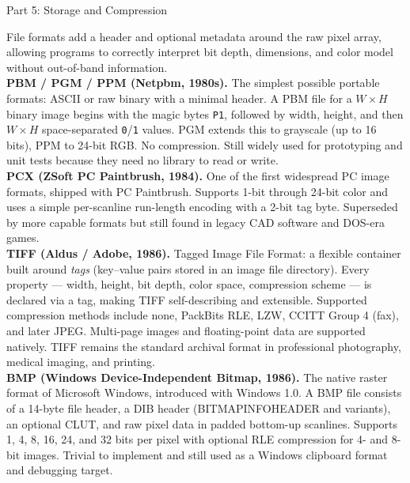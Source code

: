 \documentclass[letterpaper]{article}
\begin{document}
\begin{notes}{Part 5: Storage and Compression}

File formats add a header and optional metadata around the raw pixel array, allowing programs to correctly interpret bit depth, dimensions, and color model without out-of-band information.\\

\textbf{PBM / PGM / PPM (Netpbm, 1980s).} The simplest possible portable formats: ASCII or raw binary with a minimal header. A PBM file for a $W\times H$ binary image begins with the magic bytes \texttt{P1}, followed by width, height, and then $W\times H$ space-separated \texttt{0}/\texttt{1} values. PGM extends this to grayscale (up to 16 bits), PPM to 24-bit RGB. No compression. Still widely used for prototyping and unit tests because they need no library to read or write.\\

\textbf{PCX (ZSoft PC Paintbrush, 1984).} One of the first widespread PC image formats, shipped with PC Paintbrush. Supports 1-bit through 24-bit color and uses a simple per-scanline run-length encoding with a 2-bit tag byte. Superseded by more capable formats but still found in legacy CAD software and DOS-era games.\\

\textbf{TIFF (Aldus / Adobe, 1986).} Tagged Image File Format: a flexible container built around \emph{tags} (key--value pairs stored in an image file directory). Every property --- width, height, bit depth, color space, compression scheme --- is declared via a tag, making TIFF self-describing and extensible. Supported compression methods include none, PackBits RLE, LZW, CCITT Group 4 (fax), and later JPEG. Multi-page images and floating-point data are supported natively. TIFF remains the standard archival format in professional photography, medical imaging, and printing.\\

\textbf{BMP (Windows Device-Independent Bitmap, 1986).} The native raster format of Microsoft Windows, introduced with Windows 1.0. A BMP file consists of a 14-byte file header, a DIB header (BITMAPINFOHEADER and variants), an optional CLUT, and raw pixel data in padded bottom-up scanlines. Supports 1, 4, 8, 16, 24, and 32 bits per pixel with optional RLE compression for 4- and 8-bit images. Trivial to implement and still used as a Windows clipboard format and debugging target.\\


\end{notes}
\end{document}
